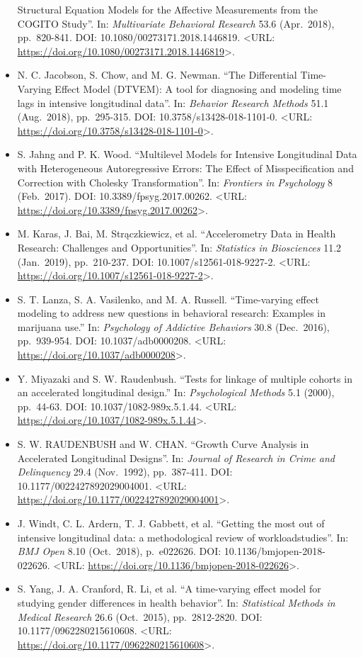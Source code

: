 \documentclass[]{book}
\begin{document}
\begin{itemize}
  Structural Equation Models for the Affective Measurements from the COGITO Study''. In: \emph{Multivariate Behavioral Research}
  53.6 (Apr.~2018), pp.~820-841. DOI: 10.1080/00273171.2018.1446819. \textless{}URL: \url{https://doi.org/10.1080/00273171.2018.1446819}\textgreater{}.
\item
  N. C. Jacobson, S. Chow, and M. G. Newman. ``The Differential Time-Varying Effect Model (DTVEM): A tool for diagnosing
  and modeling time lags in intensive longitudinal data''. In: \emph{Behavior Research Methods} 51.1 (Aug.~2018), pp.~295-315.
  DOI: 10.3758/s13428-018-1101-0. \textless{}URL: \url{https://doi.org/10.3758/s13428-018-1101-0}\textgreater{}.
\item
  S. Jahng and P. K. Wood. ``Multilevel Models for Intensive Longitudinal Data with Heterogeneous Autoregressive Errors:
  The Effect of Misspecification and Correction with Cholesky Transformation''. In: \emph{Frontiers in Psychology} 8 (Feb.~2017).
  DOI: 10.3389/fpsyg.2017.00262. \textless{}URL: \url{https://doi.org/10.3389/fpsyg.2017.00262}\textgreater{}.
\item
  M. Karas, J. Bai, M. Strączkiewicz, et al. ``Accelerometry Data in Health Research: Challenges and Opportunities''.
  In: \emph{Statistics in Biosciences} 11.2 (Jan.~2019), pp.~210-237. DOI: 10.1007/s12561-018-9227-2. \textless{}URL:
  \url{https://doi.org/10.1007/s12561-018-9227-2}\textgreater{}.
\item
  S. T. Lanza, S. A. Vasilenko, and M. A. Russell. ``Time-varying effect modeling to address new questions in
  behavioral research: Examples in marijuana use.'' In: \emph{Psychology of Addictive Behaviors} 30.8 (Dec.~2016), pp.~939-954.
  DOI: 10.1037/adb0000208. \textless{}URL: \url{https://doi.org/10.1037/adb0000208}\textgreater{}.
\item
  Y. Miyazaki and S. W. Raudenbush. ``Tests for linkage of multiple cohorts in an accelerated longitudinal design.'' In:
  \emph{Psychological Methods} 5.1 (2000), pp.~44-63. DOI: 10.1037/1082-989x.5.1.44. \textless{}URL:
  \url{https://doi.org/10.1037/1082-989x.5.1.44}\textgreater{}.
\item
  S. W. RAUDENBUSH and W. CHAN. ``Growth Curve Analysis in Accelerated Longitudinal Designs''. In: \emph{Journal of Research
  in Crime and Delinquency} 29.4 (Nov.~1992), pp.~387-411. DOI: 10.1177/0022427892029004001. \textless{}URL:
  \url{https://doi.org/10.1177/0022427892029004001}\textgreater{}.
\item
  J. Windt, C. L. Ardern, T. J. Gabbett, et al. ``Getting the most out of intensive longitudinal data: a methodological
  review of workload\textendashinjury studies''. In: \emph{BMJ Open} 8.10 (Oct.~2018), p.~e022626. DOI:
  10.1136/bmjopen-2018-022626. \textless{}URL: \url{https://doi.org/10.1136/bmjopen-2018-022626}\textgreater{}.
\item
  S. Yang, J. A. Cranford, R. Li, et al. ``A time-varying effect model for studying gender differences in health
  behavior''. In: \emph{Statistical Methods in Medical Research} 26.6 (Oct.~2015), pp.~2812-2820. DOI: 10.1177/0962280215610608.
  \textless{}URL: \url{https://doi.org/10.1177/0962280215610608}\textgreater{}.
\end{itemize}
\end{document}

